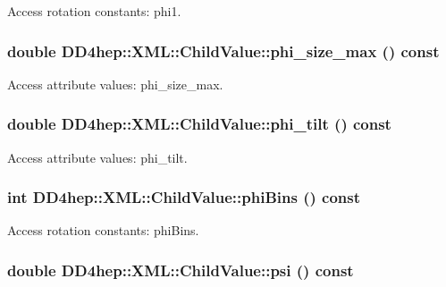 Access rotation constants: phi1. \hypertarget{struct_d_d4hep_1_1_x_m_l_1_1_child_value_a2fdfd2557aa5680af6d8dae632a17e47}{
\subsubsection[{phi\_\-size\_\-max}]{\setlength{\rightskip}{0pt plus 5cm}double DD4hep::XML::ChildValue::phi\_\-size\_\-max () const}}
\label{struct_d_d4hep_1_1_x_m_l_1_1_child_value_a2fdfd2557aa5680af6d8dae632a17e47}


Access attribute values: phi\_\-size\_\-max. \hypertarget{struct_d_d4hep_1_1_x_m_l_1_1_child_value_a868532f496cd5f6965158286080db18d}{
\subsubsection[{phi\_\-tilt}]{\setlength{\rightskip}{0pt plus 5cm}double DD4hep::XML::ChildValue::phi\_\-tilt () const}}
\label{struct_d_d4hep_1_1_x_m_l_1_1_child_value_a868532f496cd5f6965158286080db18d}


Access attribute values: phi\_\-tilt. \hypertarget{struct_d_d4hep_1_1_x_m_l_1_1_child_value_aa3115af27580c0c2db2387744ad00d52}{
\subsubsection[{phiBins}]{\setlength{\rightskip}{0pt plus 5cm}int DD4hep::XML::ChildValue::phiBins () const}}
\label{struct_d_d4hep_1_1_x_m_l_1_1_child_value_aa3115af27580c0c2db2387744ad00d52}


Access rotation constants: phiBins. \hypertarget{struct_d_d4hep_1_1_x_m_l_1_1_child_value_aa2a4dc3fe1286cb4e30a68a6b7bec941}{
\subsubsection[{psi}]{\setlength{\rightskip}{0pt plus 5cm}double DD4hep::XML::ChildValue::psi () const}}
\label{struct_d_d4hep_1_1_x_m_l_1_1_child_value_aa2a4dc3fe1286cb4e30a68a6b7bec941}



